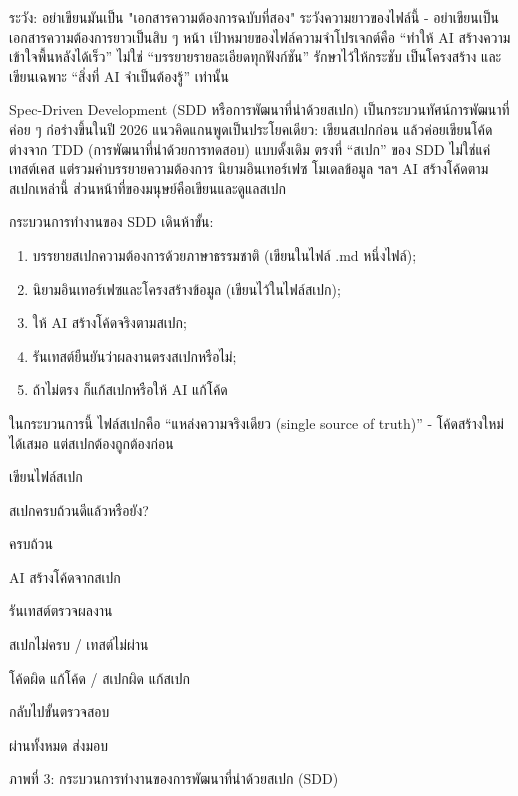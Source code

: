 \begin{tcbwarn}{ระวัง: อย่าเขียนมันเป็น "เอกสารความต้องการฉบับที่สอง"}
ระวังความยาวของไฟล์นี้ - อย่าเขียนเป็นเอกสารความต้องการยาวเป็นสิบ ๆ หน้า เป้าหมายของไฟล์ความจำโปรเจกต์คือ “ทำให้ AI สร้างความเข้าใจพื้นหลังได้เร็ว” ไม่ใช่ “บรรยายรายละเอียดทุกฟังก์ชัน” รักษาไว้ให้กระชับ เป็นโครงสร้าง และเขียนเฉพาะ “สิ่งที่ AI จำเป็นต้องรู้” เท่านั้น

\end{tcbwarn}


Spec-Driven Development (SDD หรือการพัฒนาที่นำด้วยสเปก) เป็นกระบวนทัศน์การพัฒนาที่ค่อย ๆ ก่อร่างขึ้นในปี 2026 แนวคิดแกนพูดเป็นประโยคเดียว: เขียนสเปกก่อน แล้วค่อยเขียนโค้ด ต่างจาก TDD (การพัฒนาที่นำด้วยการทดสอบ) แบบดั้งเดิม ตรงที่ “สเปก” ของ SDD ไม่ใช่แค่เทสต์เคส แต่รวมคำบรรยายความต้องการ นิยามอินเทอร์เฟซ โมเดลข้อมูล ฯลฯ AI สร้างโค้ดตามสเปกเหล่านี้ ส่วนหน้าที่ของมนุษย์คือเขียนและดูแลสเปก

กระบวนการทำงานของ SDD เดินห้าขั้น:

\begin{enumerate}
  \item บรรยายสเปกความต้องการด้วยภาษาธรรมชาติ (เขียนในไฟล์ .md หนึ่งไฟล์);
  \item นิยามอินเทอร์เฟซและโครงสร้างข้อมูล (เขียนไว้ในไฟล์สเปก);
  \item ให้ AI สร้างโค้ดจริงตามสเปก;
  \item รันเทสต์ยืนยันว่าผลงานตรงสเปกหรือไม่;
  \item ถ้าไม่ตรง ก็แก้สเปกหรือให้ AI แก้โค้ด
\end{enumerate}

ในกระบวนการนี้ ไฟล์สเปกคือ “แหล่งความจริงเดียว (single source of truth)” - โค้ดสร้างใหม่ได้เสมอ แต่สเปกต้องถูกต้องก่อน

เขียนไฟล์สเปก

สเปกครบถ้วนดีแล้วหรือยัง?

ครบถ้วน

AI สร้างโค้ดจากสเปก

รันเทสต์ตรวจผลงาน

สเปกไม่ครบ / เทสต์ไม่ผ่าน

โค้ดผิด แก้โค้ด / สเปกผิด แก้สเปก

กลับไปขั้นตรวจสอบ

ผ่านทั้งหมด ส่งมอบ

\begin{center}\small\color{gray}ภาพที่ 3: กระบวนการทำงานของการพัฒนาที่นำด้วยสเปก (SDD)\end{center}

